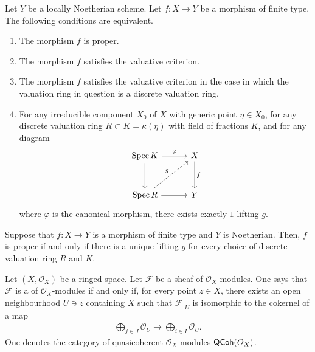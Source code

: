 \documentclass [11 pt, oneside] {article}
\begin{document}
\begin{theorem}\label{}\index{}\text{}
Let $Y$ be a locally Noetherian scheme. Let $f: X\longrightarrow Y$ be a morphism of finite type. The following conditions are equivalent.
\begin{enumerate}
	\item The morphism $f$ is proper.
	\item The morphism $f$ satisfies the valuative criterion.
	\item The morphism $f$ satisfies the valuative criterion in the case in which the valuation ring in question is a discrete valuation ring.
	\item For any irreducible component $X_0$ of $X$ with generic point $\eta \in X_0$, for any discrete valuation ring $R \subset K = \kappa(\eta)$ with field of fractions $K$, and for any diagram
		\[
		\begin{tikzcd}[row sep = 3 em, column sep = 3 em]
			\Spec K \ar[r,"\varphi"]\ar[d] &X\ar[d, "f"]\\ \Spec R \ar[r]\ar[ur,dashed, "g"] & Y
		\end{tikzcd}
		\]
		where $\varphi$ is the canonical morphism, there exists exactly $1$ lifting $g$.
\end{enumerate}
\end{theorem}

\begin{remark}
	Suppose that $f:X\longrightarrow Y$ is a morphism of finite type and $Y$ is Noetherian. Then, $f$ is proper if and only if there is a unique lifting $g$ for every choice of discrete valuation ring $R$ and $K$. 
\end{remark}

\begin{definition}\label{}\text{}
Let $(X, \mathscr{O}_X)$ be a ringed space. Let $\mathscr{F}$ be a sheaf of $\mathscr{O}_X$-modules. One says that $\mathscr{F}$ is a  of $\mathscr{O}_X$-modules if and only if, for every point $z\in X$, there exists an open neighbourhood $U\ni z$ containing $X$ such that $\mathscr{F}\big|_U$ is isomorphic to the cokernel of a map
\begin{align*}
	\bigoplus_{j\in J}\mathscr{O}_U \longrightarrow \bigoplus_{i\in I}\mathscr{O}_U.
\end{align*}
One denotes the category of quasicoherent $\mathscr{O}_X$-modules $\textsf{QCoh}(\relax{O}_X)$.
\end{definition}
\end{document}
